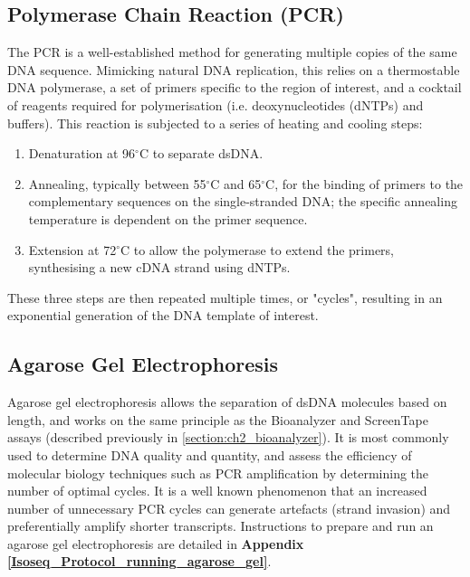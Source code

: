 \subsection{Polymerase Chain Reaction (PCR)}
\label{section:ch2_PCR_explanation} 
The PCR is a well-established method for generating multiple copies of the same DNA sequence. Mimicking natural DNA replication, this relies on a thermostable DNA polymerase, a set of primers specific to the region of interest, and a cocktail of reagents required for polymerisation (i.e. deoxynucleotides (dNTPs) and buffers). This reaction is subjected to a series of heating and cooling steps: 
\begin{enumerate}
	\item Denaturation at 96$^{\circ}$C to separate dsDNA. 
	\item Annealing, typically between 55$^{\circ}$C  and 65$^{\circ}$C, for the binding of primers to the complementary sequences on the single-stranded DNA; the specific annealing temperature is dependent on the primer sequence. 
	\item Extension at 72$^{\circ}$C to allow the polymerase to extend the primers, synthesising a new cDNA strand using dNTPs.
\end{enumerate} 
These three steps are then repeated multiple times, or "cycles", resulting in an exponential generation of the DNA template of interest.

\subsection{Agarose Gel Electrophoresis}
\label{section:ch2_agarose_explanation}  
Agarose gel electrophoresis allows the separation of dsDNA molecules based on length, and works on the same principle as the Bioanalyzer and ScreenTape assays (described previously in \cref{section:ch2_bioanalyzer}). It is most commonly used to determine DNA quality and quantity, and assess the efficiency of molecular biology techniques such as PCR amplification by determining the number of optimal cycles. It is a well known phenomenon that an increased number of unnecessary PCR cycles can generate artefacts (strand invasion) and preferentially amplify shorter transcripts\cite{Acinas2005,Bayega2018}. Instructions to prepare and run an agarose gel electrophoresis are detailed in \textbf{Appendix \ref{Isoseq_Protocol_running_agarose_gel}}.


